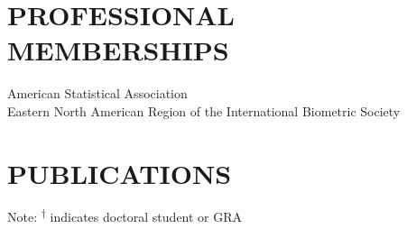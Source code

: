 \documentclass[11pt]{article}
\begin{document}
\section*{\large \bf PROFESSIONAL MEMBERSHIPS}
American Statistical Association\vspace{5pt}\\
Eastern North American Region of the International Biometric Society
\clearpage
\section*{\large \bf PUBLICATIONS}
Note: \textbf{\textsuperscript{$\dagger$}} indicates doctoral student or GRA \vspace{5pt}




\end{document}
